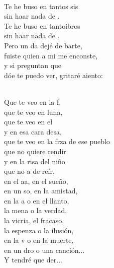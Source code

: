 \begin{cancion}%
	    \\
	Te he buso en tantos sis \\
	sin haar nada de . \\
	Te he buso en tantoibros\\
	sin haar nada de . \\
\jump
	Pero un da dejé de barte, \\
	fuiste  quien a mi me enconste, \\
	y si  preguntan que \\
	dóe te puedo ver, gritaré aiento:\\\jump\\
	\begin{chorus}%
	Que te veo en la f, \\
	que te veo en luna,\\
	que te veo en el  \\
	y en esa cara desa,\\
	que te veo en la frza de ese pueblo\\
	que no  quiere rendir\\
	y en la risa del niño \\
	que no a de reír,\\
	en el aa, en el sueño, \\
	en un so, en la amistad,\\
	en la a o en el llanto, \\
	la mena o la verdad,\\
	la vicria, el fracaso, \\
	la espenza o la ilusión,\\
	en la v o en la muerte, \\
	en un dro o una canción...\\
	Y tendré que der...\\

\end{chorus}
\end{cancion}
